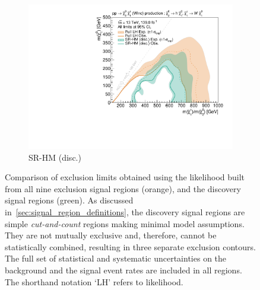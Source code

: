 \begin{figure}
\begin{subfigure}[b]{0.5\textwidth}
		\centering\includegraphics[width=\textwidth]{exclusion_1Lbb_SRHM_noLabel_v2}
		\caption{SR-HM (disc.)\label{fig:single_bin_SRHM}}
	\end{subfigure}%
	\caption{Comparison of exclusion limits obtained using the likelihood built from all nine exclusion signal regions (orange), and the discovery signal regions (green). As discussed in~\cref{sec:signal_region_definitions}, the discovery signal regions are simple \textit{cut-and-count} regions making minimal model assumptions. They are not mutually exclusive and, therefore, cannot be statistically combined, resulting in three separate exclusion contours. The full set of statistical and systematic uncertainties on the background and the signal event rates are included in all regions. The shorthand notation `LH' refers to likelihood.}\label{fig:single_bin}
\end{figure}

